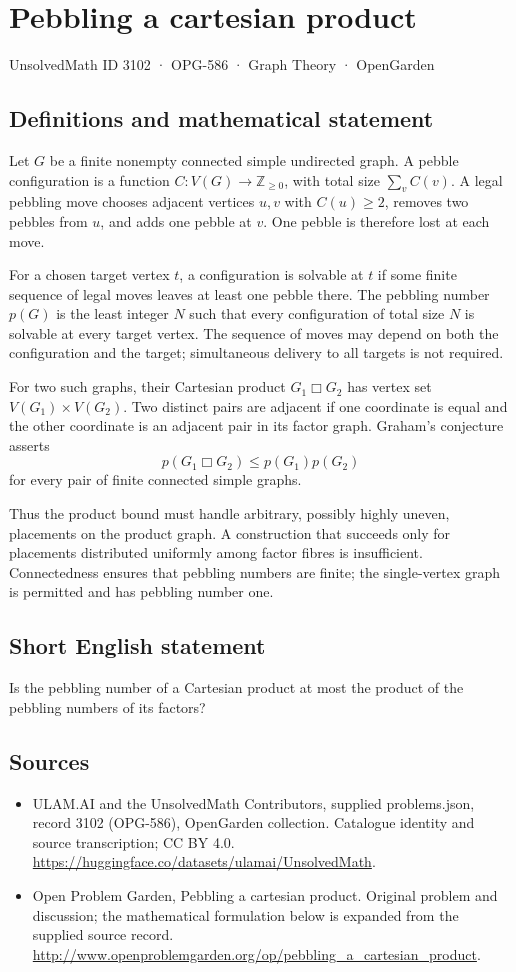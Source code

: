 \documentclass[11pt,a4paper]{article}
\begin{document}
\section*{Pebbling a cartesian product}\label{3102}
{\small UnsolvedMath ID 3102 · OPG-586 · Graph Theory · OpenGarden}
\subsection{Definitions and mathematical statement}
Let $G$ be a finite nonempty connected simple undirected graph.
A pebble configuration is a function $C:V(G)\to\mathbb Z_{\ge0}$,
with total size $\sum_v C(v)$. A legal pebbling move chooses adjacent
vertices $u,v$ with $C(u)\ge2$, removes two pebbles from $u$, and adds
one pebble at $v$. One pebble is therefore lost at each move.

For a chosen target vertex $t$, a configuration is solvable at $t$ if
some finite sequence of legal moves leaves at least one pebble there.
The pebbling number $p(G)$ is the least integer $N$ such that every
configuration of total size $N$ is solvable at every target vertex.
The sequence of moves may depend on both the configuration and the
target; simultaneous delivery to all targets is not required.

For two such graphs, their Cartesian product $G_1\mathbin\Box G_2$ has
vertex set $V(G_1)\times V(G_2)$. Two distinct pairs are adjacent if
one coordinate is equal and the other coordinate is an adjacent pair
in its factor graph.
Graham's conjecture asserts
\[
 p(G_1\mathbin\Box G_2)\le p(G_1)p(G_2)
\]
for every pair of finite connected simple graphs.

Thus the product bound must handle arbitrary, possibly highly uneven,
placements on the product graph. A construction that succeeds only for
placements distributed uniformly among factor fibres is insufficient.
Connectedness ensures that pebbling numbers are finite; the single-vertex
graph is permitted and has pebbling number one.
\subsection{Short English statement}
Is the pebbling number of a Cartesian product at most the product of the pebbling numbers of its factors?
\subsection{Sources}
\begin{itemize}
\item[S1] ULAM.AI and the UnsolvedMath Contributors, supplied problems.json, record 3102 (OPG-586), OpenGarden collection. Catalogue identity and source transcription; CC BY 4.0.
\url{https://huggingface.co/datasets/ulamai/UnsolvedMath}.
\item[S2] Open Problem Garden, Pebbling a cartesian product. Original problem and discussion; the mathematical formulation below is expanded from the supplied source record.
\url{http://www.openproblemgarden.org/op/pebbling_a_cartesian_product}.
\end{itemize}
\end{document}
